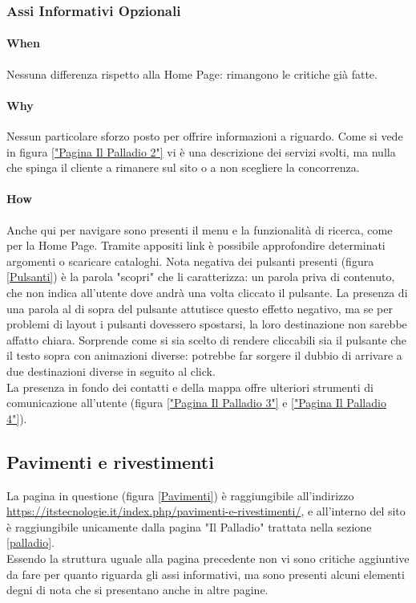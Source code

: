 \subsubsection{Assi Informativi Opzionali}

\paragraph{When}
Nessuna differenza rispetto alla Home Page: rimangono le critiche già fatte.
\paragraph{Why}
Nessun particolare sforzo posto per offrire informazioni a riguardo. Come si vede in figura \ref{"Pagina Il Palladio 2"} vi è una descrizione dei servizi svolti, ma nulla che spinga il cliente a rimanere sul sito o a non scegliere la concorrenza.
\paragraph{How}
Anche qui per navigare sono presenti il menu e la funzionalità di ricerca, come per la Home Page. Tramite appositi link è possibile approfondire determinati argomenti o scaricare cataloghi. Nota negativa dei pulsanti presenti (figura \ref{Pulsanti}) è la parola "scopri" che li caratterizza: un parola priva di contenuto, che non indica all'utente dove andrà una volta cliccato il pulsante. La presenza di una parola al di sopra del pulsante attutisce questo effetto negativo, ma se per problemi di layout i pulsanti dovessero spostarsi, la loro destinazione non sarebbe affatto chiara. Sorprende come si sia scelto di rendere cliccabili sia il pulsante che il testo sopra con animazioni diverse: potrebbe far sorgere il dubbio di arrivare a due destinazioni diverse in seguito al click. \\
La presenza in fondo dei contatti e della mappa offre ulteriori strumenti di comunicazione all'utente (figura \ref{"Pagina Il Palladio 3"} e \ref{"Pagina Il Palladio 4"}).


\subsection{Pavimenti e rivestimenti}
La pagina in questione (figura \ref{Pavimenti}) è raggiungibile all'indirizzo \\ \url{https://itstecnologie.it/index.php/pavimenti-e-rivestimenti/}, e all'interno del sito è raggiungibile unicamente dalla pagina "Il Palladio" trattata nella sezione \ref{palladio}. \\ Essendo la struttura uguale alla pagina precedente non vi sono critiche aggiuntive da fare per quanto riguarda gli assi informativi, ma sono presenti alcuni elementi degni di nota che si presentano anche in altre pagine.

